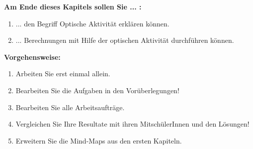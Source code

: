 \documentclass{scrartcl}  %
\begin{document}
		\begin{minipage}{0.7\textwidth}
			\noindent \textbf{Am Ende dieses Kapitels sollen Sie ... :}
			\begin{enumerate}
				\item ... den Begriff Optische Aktivität erklären können.
				\item ... Berechnungen mit Hilfe der optischen Aktivität durchführen können.
			\end{enumerate}
			\textbf{Vorgehensweise:}
			\begin{enumerate}
				\item Arbeiten Sie erst einmal allein.
				\item Bearbeiten Sie die Aufgaben in den Vorüberlegungen!
				\item Bearbeiten Sie alle Arbeitsaufträge.
				\item Vergleichen Sie Ihre Resultate mit ihren MitschülerInnen und den Lösungen!
				\item Erweitern Sie die Mind-Maps aus den ersten Kapiteln. 
			\end{enumerate}
			
		\end{minipage}
		\hspace{0.1\textwidth}
\end{document}
